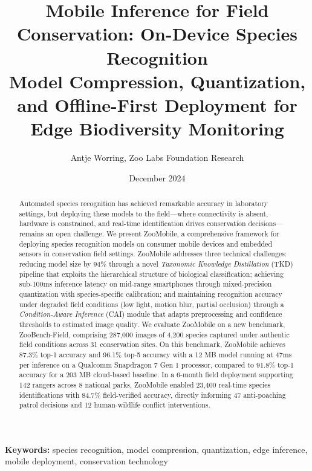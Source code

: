 \documentclass[11pt,a4paper]{article}
\title{\textbf{Mobile Inference for Field Conservation: On-Device Species Recognition} \\[0.5em]
\large Model Compression, Quantization, and Offline-First Deployment for Edge Biodiversity Monitoring}
\author[1]{Antje Worring, Zoo Labs Foundation Research}
\affil[1]{Antje Worring, Zoo Labs Foundation Research, Research Division \\ \texttt{research@zoo.ngo}}
\date{December 2024}
\begin{document}
\zoocoverpage

\begin{abstract}
\noindent
Automated species recognition has achieved remarkable accuracy in laboratory settings, but deploying these models to the field---where connectivity is absent, hardware is constrained, and real-time identification drives conservation decisions---remains an open challenge.
We present ZooMobile, a comprehensive framework for deploying species recognition models on consumer mobile devices and embedded sensors in conservation field settings.
ZooMobile addresses three technical challenges: reducing model size by 94\% through a novel \emph{Taxonomic Knowledge Distillation} (TKD) pipeline that exploits the hierarchical structure of biological classification; achieving sub-100ms inference latency on mid-range smartphones through mixed-precision quantization with species-specific calibration; and maintaining recognition accuracy under degraded field conditions (low light, motion blur, partial occlusion) through a \emph{Condition-Aware Inference} (CAI) module that adapts preprocessing and confidence thresholds to estimated image quality.
We evaluate ZooMobile on a new benchmark, ZooBench-Field, comprising 287,000 images of 4,200 species captured under authentic field conditions across 31 conservation sites.
On this benchmark, ZooMobile achieves 87.3\% top-1 accuracy and 96.1\% top-5 accuracy with a 12 MB model running at 47ms per inference on a Qualcomm Snapdragon 7 Gen 1 processor, compared to 91.8\% top-1 accuracy for a 203 MB cloud-based baseline.
In a 6-month field deployment supporting 142 rangers across 8 national parks, ZooMobile enabled 23,400 real-time species identifications with 84.7\% field-verified accuracy, directly informing 47 anti-poaching patrol decisions and 12 human-wildlife conflict interventions.
\end{abstract}

\vspace{0.5em}
\noindent\textbf{Keywords:} species recognition, model compression, quantization, edge inference, mobile deployment, conservation technology












\end{document}

